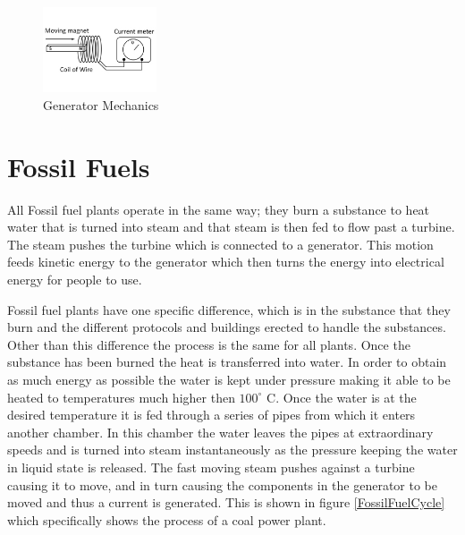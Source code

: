 \documentclass[msc,oneside]{ubcthesis}%
\begin{document}
  \begin{figure}[hbt]{\label{Induction} }
  \begin{center}
    \includegraphics[width=0.3\textwidth]{Induction}
    \caption[Generator Mechanics]{Generator Mechanics}  
  \end{center}
\end{figure}

\newpage
  \section{Fossil Fuels}

  All Fossil fuel plants operate in the same way; they burn a substance to heat water that is turned into 
  steam and that steam is then fed to flow past a turbine. The steam pushes the turbine which is connected to a generator. This motion feeds kinetic energy to the generator which then turns the energy into electrical energy for people to use.

Fossil fuel plants have one specific difference, which is in the substance that they burn and the different protocols and buildings erected to handle the substances. Other than this difference the process is the same for all plants. Once the substance has been burned the heat is transferred into water. In order to obtain as much energy as possible the water is kept under pressure making it able to be heated to temperatures much higher then $100^\circ$ C. Once the water is at the desired temperature it is fed through a series of pipes from which it enters another chamber. In this chamber the water leaves the pipes at extraordinary speeds and is turned into steam instantaneously as the pressure keeping the water in liquid state is released. The fast moving steam pushes against a turbine causing it to move, and in turn causing the components in the generator to be moved and thus a current is generated. This is shown in figure \ref{FossilFuelCycle} which specifically shows the process of a coal power plant. 
\end{document}

